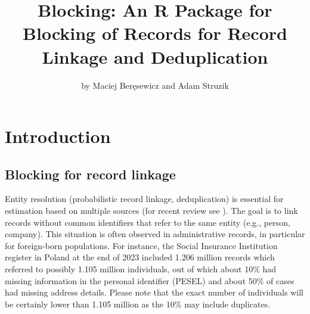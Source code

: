 \title{Blocking: An R Package for Blocking of Records for Record Linkage and Deduplication}


\author{by Maciej Beręsewicz and Adam Struzik}

\maketitle


\section{Introduction}\label{introduction}

\subsection{Blocking for record linkage}\label{blocking-for-record-linkage}

Entity resolution (probabilistic record linkage, deduplication) is essential for estimation based on multiple sources (for recent review see \citet{Binette2022}). The goal is to link records without common identifiers that refer to the same entity (e.g., person, company). This situation is often observed in administrative records, in particular for foreign-born populations. For instance, the Social Insurance Institution register in Poland at the end of 2023 included 1.206 million records which referred to possibly 1.105 million individuals, out of which about 10\% had missing information in the personal identifier (PESEL) and about 50\% of cases had missing address details. Please note that the exact number of individuals will be certainly lower than 1.105 million as the 10\% may include duplicates.

